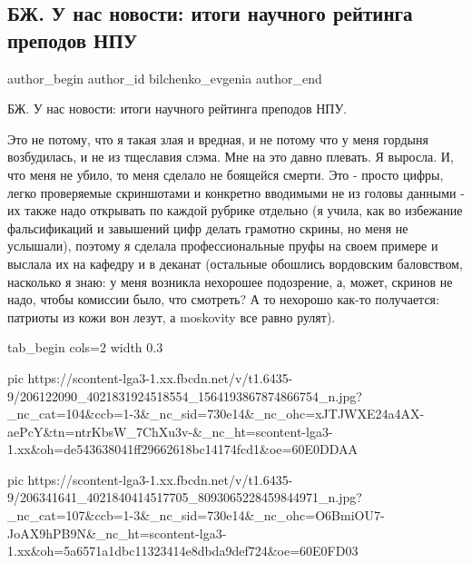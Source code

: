  
 
 
 
 
 
\subsection{БЖ. У нас новости: итоги научного рейтинга преподов НПУ}
\label{sec:30_06_2021.fb.bilchenko_evgenia.1.rejting_npu_nauka}
\ifcmt
 author_begin
   author_id bilchenko_evgenia
 author_end
\fi

БЖ. У нас новости: итоги научного рейтинга преподов НПУ.

Это не потому, что я такая злая и вредная, и не потому что у меня гордыня
возбудилась, и не из тщеславия слэма. Мне на это давно плевать. Я выросла. И,
что меня не убило, то меня сделало не боящейся смерти. Это - просто цифры,
легко проверяемые скриншотами и конкретно вводимыми не из головы данными - их
также надо открывать по каждой рубрике отдельно (я учила, как во избежание
фальсификаций и завышений цифр делать грамотно скрины, но меня не услышали),
поэтому я сделала профессиональные пруфы на своем примере и выслала их на
кафедру и в деканат (остальные обошлись вордовским баловством, насколько я
знаю: у меня возникла нехорошее подозрение, а, может, скринов не надо, чтобы
комиссии было, что смотреть? А то нехорошо как-то получается: патриоты из кожи
вон лезут, а moskovity все равно рулят). 

\ifcmt
  tab_begin cols=2
     width 0.3

     pic https://scontent-lga3-1.xx.fbcdn.net/v/t1.6435-9/206122090_4021831924518554_1564193867874866754_n.jpg?_nc_cat=104&ccb=1-3&_nc_sid=730e14&_nc_ohc=xJTJWXE24a4AX-aePcY&tn=ntrKbsW_7ChXu3v-&_nc_ht=scontent-lga3-1.xx&oh=de543638041ff29662618bc14174fcd1&oe=60E0DDAA

     pic https://scontent-lga3-1.xx.fbcdn.net/v/t1.6435-9/206341641_4021840414517705_8093065228459844971_n.jpg?_nc_cat=107&ccb=1-3&_nc_sid=730e14&_nc_ohc=O6BmiOU7-JoAX9hPB9N&_nc_ht=scontent-lga3-1.xx&oh=5a6571a1dbc11323414e8dbda9def724&oe=60E0FD03

